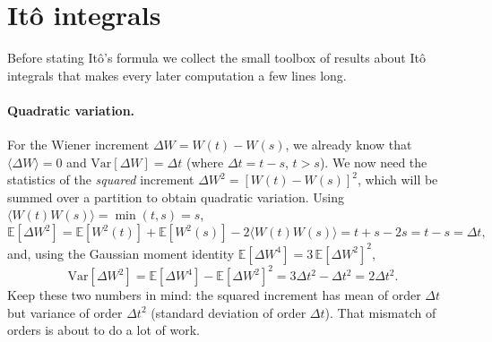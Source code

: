 \section{It\^o integrals}

Before stating It\^o's formula we collect\cite{Ito1944} the small toolbox of results about It\^o integrals that makes every later computation a few lines long.

\paragraph{Quadratic variation.}
For the Wiener increment $\Delta W = W(t)-W(s)$, we already know that $\langle\Delta W\rangle=0$ and $\mathrm{Var}[\Delta W]=\Delta t$ (where $\Delta t = t-s$, $t>s$).
We now need the statistics of the \emph{squared} increment $\Delta W^2 = [W(t)-W(s)]^2$, which will be summed over a partition to obtain quadratic variation.
Using $\langle W(t)W(s)\rangle=\min(t,s)=s$,
\begin{equation}
\mathbb{E}[\Delta W^2] = \mathbb{E}[W^2(t)] + \mathbb{E}[W^2(s)] - 2\langle W(t)W(s)\rangle = t + s - 2s = t-s = \Delta t,
\end{equation}
and, using the Gaussian moment identity $\mathbb{E}[\Delta W^4]=3\,\mathbb{E}[\Delta W^2]^2$,
\begin{equation}
\mathrm{Var}[\Delta W^2] = \mathbb{E}[\Delta W^4] - \mathbb{E}[\Delta W^2]^2 = 3\Delta t^2 - \Delta t^2 = 2\Delta t^2.
\end{equation}
Keep these two numbers in mind: the squared increment has mean of order $\Delta t$ but variance of order $\Delta t^2$ (standard deviation of order $\Delta t$).
That mismatch of orders is about to do a lot of work.

